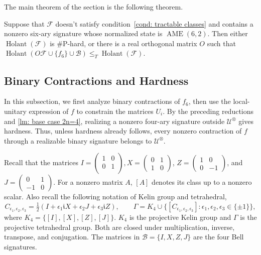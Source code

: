 The main theorem of the section is the following theorem.


\begin{theorem}[Realizing $f_6$]
\label{thm:f6-equality-realization}
Suppose that $\mathcal F$ doesn't satisfy condition~\eqref{cond: tractable classes} and contains a nonzero six-ary signature whose
normalized state is $\operatorname{AME}(6,2)$. Then either
$\operatorname{Holant}(\mathcal F)$ is $\#\mathrm P$-hard, or there
is a real orthogonal matrix $O$ such that
\(
 \operatorname{Holant}(O\mathcal F\cup\{f_6\}\cup\mathcal B)
 \leq_T \operatorname{Holant}(\mathcal F).
\)
\end{theorem}






\subsection{Binary Contractions and Hardness}
\label{subsec:f6-binary-contractions}

In this subsection, we first analyze binary contractions of $f_6$,
then use the local-unitary expression of $f$ to constrain the matrices
$U_i$. By the preceding reductions and \cref{lm: base case 2n=4},
realizing a nonzero four-ary signature outside $\mathcal U^\otimes$
gives hardness. Thus, unless hardness already follows, every nonzero
contraction of $f$ through a realizable binary signature belongs to
$\mathcal U^\otimes$.

Recall that the matrices $I=\left(\begin{matrix}
    1 & 0\\
    0 & 1\\
\end{matrix}\right),X=\left(\begin{matrix}0&1\\1&0\end{matrix}\right)$,
$Z=\left(\begin{matrix}1&0\\0&-1\end{matrix}\right)$, and
$J=\left(\begin{matrix}0&1\\-1&0\end{matrix}\right)$. For a nonzero matrix $A$, $[A]$ denotes its class up to a nonzero scalar. Also recall the following notation of Kelin group and tetrahedral,
\[
 C_{\epsilon_1,\epsilon_2,\epsilon_3}
 =\tfrac12(I+\epsilon_1\mathfrak iX+\epsilon_2J+\epsilon_3\mathfrak iZ),
 \qquad
 \Gamma=K_4\cup
 \{[C_{\epsilon_1,\epsilon_2,\epsilon_3}]:
          \epsilon_1,\epsilon_2,\epsilon_3\in\{\pm1\}\},
\]
where $K_4=\{[I],[X],[Z],[J]\}$. $K_4$ is the projective Kelin group and $\Gamma$ is the projective tetrahedral group. Both are closed under multiplication, inverse, transpose, and conjugation.
The matrices in $\mathcal B=\{I,X,Z,J\}$ are the four Bell signatures.

